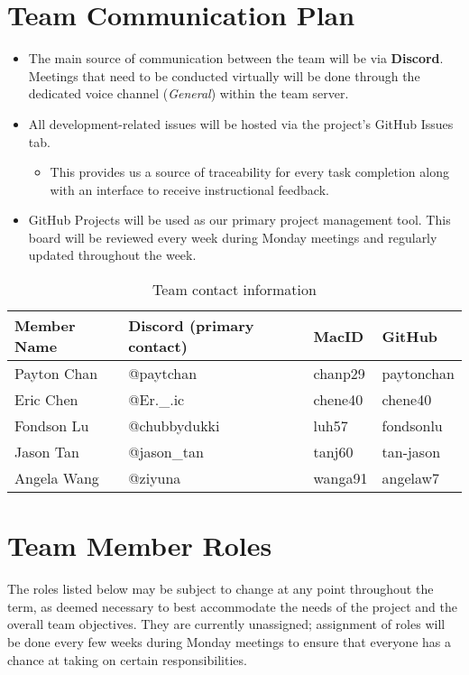 \documentclass{article}
\begin{document}
\newpage

\section{Team Communication Plan}

\begin{itemize}
    \item The main source of communication between the team will be via \textbf{Discord}. Meetings that need to be conducted virtually will be done through the dedicated voice channel (\textit{General}) within the team server.
    
    \item All development-related issues will be hosted via the project’s GitHub Issues tab.
    \begin{itemize}
        \item This provides us a source of traceability for every task completion along with an interface to receive instructional feedback.
    \end{itemize}

    \item GitHub Projects will be used as our primary project management tool. This board will be reviewed every week during Monday meetings and regularly updated throughout the week.
\end{itemize}

\begin{table}[h!]
\centering
\begin{tabular}{|l|l|l|l|}
\hline
\textbf{Member Name} & \textbf{Discord (primary contact)} & \textbf{MacID} & \textbf{GitHub} \\ \hline
Payton Chan   & @paytchan    & chanp29  & paytonchan \\ \hline
Eric Chen     & @Er._.ic     & chene40  & chene40    \\ \hline
Fondson Lu    & @chubbydukki & luh57    & fondsonlu  \\ \hline
Jason Tan     & @jason\_tan  & tanj60   & tan-jason  \\ \hline
Angela Wang   & @ziyuna      & wanga91  & angelaw7   \\ \hline
\end{tabular}
\caption{Team contact information}
\end{table}

\newpage

\section{Team Member Roles}
The roles listed below may be subject to change at any point throughout the term, as deemed necessary to best accommodate the needs of the project and the overall team objectives. They are currently unassigned; assignment of roles will be done every few weeks during Monday meetings to ensure that everyone has a chance at taking on certain responsibilities.
\end{document}
